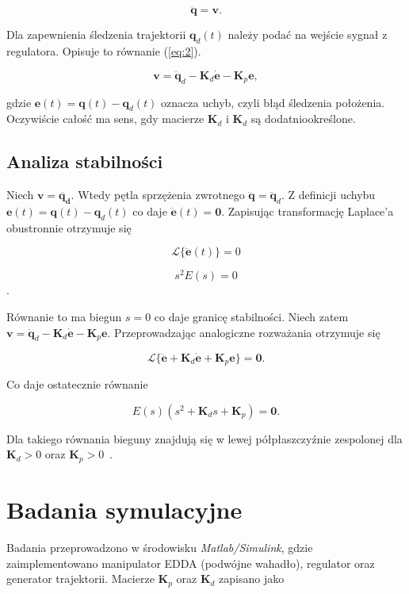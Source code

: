 \documentclass[12pt,a4paper]{article}
\newcommand{\mb}[1]{\mathbf{#1}}
\begin{document}
\begin{equation}
    \ddot{\mb{q}} = \mb{v}.
\end{equation}

Dla zapewnienia śledzenia trajektorii $\mb{q}_d(t)$ należy podać na wejście sygnał z regulatora. Opisuje to równanie (\ref{eq:2}).

\begin{equation}
    \mb{v} = \ddot{\mb{q}}_d - \mb{K}_d\dot{\mb{e}} - \mb{K}_p \mb{e},\label{eq:2}
\end{equation}

gdzie $\mb{e}(t) = \mb{q}(t) - \mb{q}_d(t)$ oznacza uchyb, czyli błąd śledzenia położenia. Oczywiście całość ma sens, gdy macierze $\mb{K}_d$ i $\mb{K}_d$ są dodatniookreślone. 

\subsection{Analiza stabilności}

Niech $\mb{v} = \ddot{\mb{q_d}}$. Wtedy pętla sprzężenia zwrotnego $\ddot{\mb{q}} = \ddot{\mb{q}}_d$. Z definicji uchybu $\mb{e}(t) = \mb{q}(t) - \mb{q}_d(t)$ co daje $\ddot{\mb{e}}(t) = \mb{0}$. Zapisując transformację Laplace'a obustronnie otrzymuje się

$$\mathscr{L}\{\ddot{\mb{e}}(t)\} = 0$$

$$s^2E(s) = 0$$.

Równanie to ma biegun $s = 0$ co daje granicę stabilności. Niech zatem $\mb{v} = \ddot{\mb{q}}_d - \mb{K}_d\dot{\mb{e}} - \mb{K}_p\mb{e}$. Przeprowadzając analogiczne rozważania otrzymuje się

$$\mathscr{L}\{\ddot{\mb{e}} + \mb{K}_d\dot{\mb{e}} + \mb{K}_p\mb{e}\} = \mb{0}.$$

Co daje ostatecznie równanie

$$E(s)(s^2+\mb{K}_ds+\mb{K}_p) = \mb{0}.$$

Dla takiego równania bieguny znajdują się w lewej półpłaszczyźnie zespolonej dla $\mb{K}_d > 0$ oraz $\mb{K}_p > 0$~\cite{Wyklad}.

\section{Badania symulacyjne}

Badania przeprowadzono w środowisku \emph{Matlab/Simulink}, gdzie zaimplementowano manipulator EDDA (podwójne wahadło), regulator oraz generator trajektorii. Macierze $\mb{K}_p$ oraz $\mb{K}_d$ zapisano jako 
\end{document}
